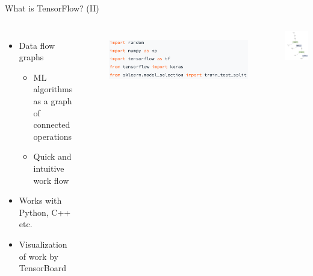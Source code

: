 \begin{frame}{What is TensorFlow? (II)}
    \begin{columns}[T]
            \vspace{1cm}
                \begin{itemize}
                    \item Data flow graphs
                    \begin{itemize}
                        \item ML algorithms as a graph of connected operations
                        \item Quick and intuitive work flow
                    \end{itemize}
                \item Works with Python, C++ etc.
                \item Visualization of work by TensorBoard
                \end{itemize}
            \begin{figure}
                \includegraphics[width=0.50\linewidth]{assets/TensorFlow_Python.png}
                \\
            \end{figure}
            \vspace{.5cm}
            \hspace*{-4cm}
            \includegraphics[width=4cm]{assets/TensorFlow_Graph_Example.png} 
                \\
                \vspace{-.1cm}
                \hspace*{-4cm}\caption{Source: tensorflow.org}
    \end{columns}
\end{frame}

